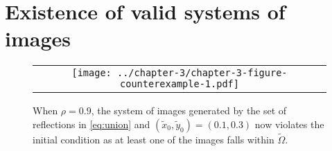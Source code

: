 





\section{Existence of valid systems of images} \label{sec:proof}
\begin{figure}[h!]
  \begin{tabular}{c}
    \begin{minipage}{0.99\textwidth}
      \centering
      \texttt{[image: ../chapter-3/chapter-3-figure-counterexample-1.pdf]}
      \caption{When $\rho=0.9$, the system of images generated by the
        set of reflections in \eqref{eq:union} and
        $(\tilde{x}_0, \tilde{y}_0) = (0.1, 0.3)$ now violates the
        initial condition as at least one of the images falls within
        $\tilde{\Omega}$. }
      \label{fig:counterexample-1}
    \end{minipage}
  \end{tabular}
\end{figure}

